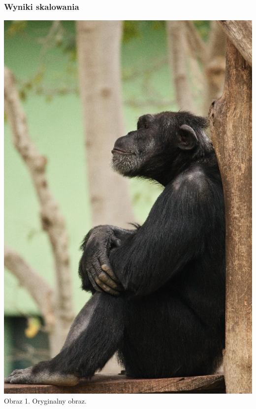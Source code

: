 \documentclass[14pt]{article}
\begin{document}
\subsubsection{Wyniki skalowania}
\begin{center}
    \vspace{1.2cm}
    \includegraphics[scale=0.2]{images/monke_512.jpg}
    \\ \small Obraz 1. Oryginalny obraz.


\end{center}
\end{document}
